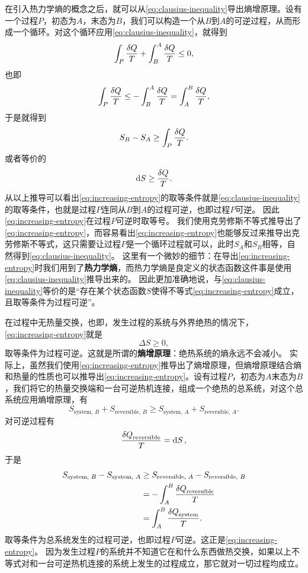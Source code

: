 \documentclass[hyperref, UTF8, a4paper]{ctexart}
\begin{document}
在引入热力学熵的概念之后，就可以从\eqref{eq:clausius-inequality}导出熵增原理。设有一个过程$P$，初态为$A$，末态为$B$，我们可以构造一个从$B$到$A$的可逆过程，从而形成一个循环。对这个循环应用\eqref{eq:clausius-inequality}，就得到
\[
    \int_P \frac{\var{Q}}{T} + \int_{B}^A \frac{\var{Q}}{T} \leq 0,
\]
也即
\[
    \int_P \frac{\var{Q}}{T} \leq - \int_{B}^A \frac{\var{Q}}{T} = \int_A^B \frac{\var{Q}}{T},
\]
于是就得到
\begin{equation}
    S_B - S_A \geq \int_P \frac{\var{Q}}{T}.
    \label{eq:increasing-entropy}
\end{equation}
或者等价的
\begin{equation}
    \dd{S} \geq \frac{\var{Q}}{T}.
\end{equation}
从以上推导可以看出\eqref{eq:increasing-entropy}的取等条件就是\eqref{eq:clausius-inequality}的取等条件，也就是过程$P$连同从$B$到$A$的过程可逆，也即过程$P$可逆。
因此\eqref{eq:increasing-entropy}在过程$P$可逆时取等号。
我们使用克劳修斯不等式推导出了\eqref{eq:increasing-entropy}，而容易看出\eqref{eq:increasing-entropy}也能够反过来推导出克劳修斯不等式，这只需要让过程$P$是一个循环过程就可以，此时$S_A$和$S_B$相等，自然得到\eqref{eq:clausius-inequality}。
这里有一个微妙的细节：在导出\eqref{eq:increasing-entropy}时我们用到了\textbf{热力学熵}，而热力学熵是良定义的状态函数这件事是使用\eqref{eq:clausius-inequality}推导出来的。
因此更加准确地说，与\eqref{eq:clausius-inequality}等价的是“存在某个状态函数$S$使得不等式\eqref{eq:increasing-entropy}成立，且取等条件为过程可逆”。

在过程中无热量交换，也即，发生过程的系统与外界绝热的情况下，\eqref{eq:increasing-entropy}就是
\begin{equation}
    \Delta S \geq 0,
\end{equation}
取等条件为过程可逆。这就是所谓的\textbf{熵增原理}：绝热系统的熵永远不会减小。
实际上，虽然我们使用\eqref{eq:increasing-entropy}推导出了熵增原理，但熵增原理结合熵和热量的性质也可以推导出\eqref{eq:increasing-entropy}。设有过程$P$，初态为$A$末态为$B$，我们将它的热量交换端和一台可逆热机连接，组成一个绝热的总系统，对这个总系统应用熵增原理，有
\[
    S_\text{system, $B$} + S_\text{reversible, $B$} \geq S_\text{system, $A$} + S_\text{reversible, $A$}.
\]
对可逆过程有
\[
    \frac{\var{Q}_\text{reversible}}{T} = \dd{S},
\]
于是
\[
    \begin{aligned}
        S_\text{system, $B$} - S_\text{system, $A$} &\geq S_\text{reversible, $A$} - S_\text{reversible, $B$} \\
        &= - \int_A^B \frac{\var{Q}_\text{reversible}}{T} \\
        &= \int_A^B \frac{\var{Q}_\text{system}}{T}.
    \end{aligned}
\]
取等条件为总系统发生的过程可逆，也即过程$P$可逆。这正是\eqref{eq:increasing-entropy}。
因为发生过程$P$的系统并不知道它在和什么东西做热交换，如果以上不等式对和一台可逆热机连接的系统上发生的过程成立，那它就对一切过程均成立。
\end{document}
